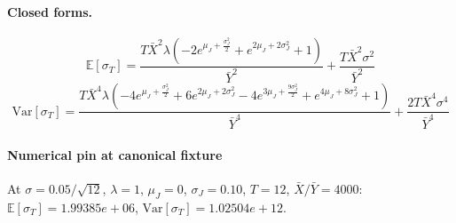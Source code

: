 \paragraph{Closed forms.}
\[ \mathbb{E}[\sigma_T] = \frac{T \bar{X}^{2} \lambda \left(- 2 e^{\mu_{J} + \frac{\sigma_{J}^{2}}{2}} + e^{2 \mu_{J} + 2 \sigma_{J}^{2}} + 1\right)}{\bar{Y}^{2}} + \frac{T \bar{X}^{2} \sigma^{2}}{\bar{Y}^{2}} \]
\[ \mathrm{Var}[\sigma_T] = \frac{T \bar{X}^{4} \lambda \left(- 4 e^{\mu_{J} + \frac{\sigma_{J}^{2}}{2}} + 6 e^{2 \mu_{J} + 2 \sigma_{J}^{2}} - 4 e^{3 \mu_{J} + \frac{9 \sigma_{J}^{2}}{2}} + e^{4 \mu_{J} + 8 \sigma_{J}^{2}} + 1\right)}{\bar{Y}^{4}} + \frac{2 T \bar{X}^{4} \sigma^{4}}{\bar{Y}^{4}} \]
\paragraph{Numerical pin at canonical fixture}
At $\sigma = 0.05/\sqrt{12}$, $\lambda = 1$, $\mu_J = 0$, $\sigma_J = 0.10$, $T = 12$, $\bar{X}/\bar{Y} = 4000$: $\mathbb{E}[\sigma_T] = 1.99385e+06$, $\mathrm{Var}[\sigma_T] = 1.02504e+12$.

